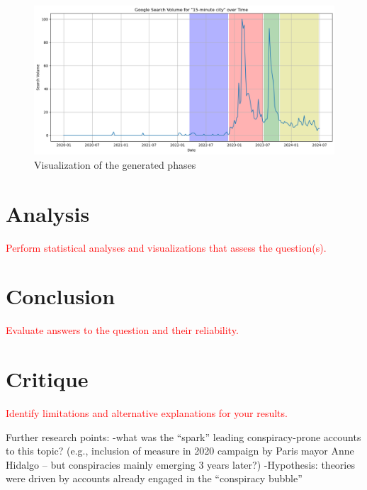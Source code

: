 \documentclass[fontsize=11pt, parskip=half]{scrartcl}
\begin{document}
    \begin{figure}{}
        \centering
        \setlength\intextsep{0pt}
        \vspace{-30pt}
        \caption{} %
        \includegraphics[width=0.8 \textwidth]{img/gtrends_phases.png}
        \vspace{-5pt}
        \caption*{Visualization of the generated phases}
        \vspace{-20pt}
        \label{fig:gtrends_phases}
    \end{figure}
    
\section{Analysis}
\label{section:analysis}

    \textcolor{red}{Perform statistical analyses and visualizations that assess the question(s).}

\section{Conclusion}
\label{section:conclusion}

    \textcolor{red}{Evaluate answers to the question and their reliability.}

\section{Critique}
\label{section:critique}

    \textcolor{red}{Identify limitations and alternative explanations for your results.}

    Further research points: 
-what was the “spark” leading conspiracy-prone accounts to this topic? (e.g., inclusion of measure in 2020 campaign by Paris mayor Anne Hidalgo – but conspiracies mainly emerging 3 years later?)
-Hypothesis: theories were driven by accounts already engaged in the “conspiracy bubble”

\newpage

\onecolumn
\begin{minipage}[t]{\textwidth}
    \printbibliography[heading=bibintoc, title={References}]
\end{minipage}
\end{document}

